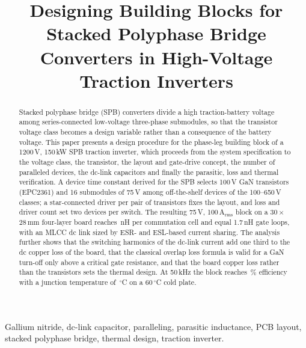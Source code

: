 \documentclass[conference]{IEEEtran}
\begin{document}
\title{Designing Building Blocks for Stacked Polyphase Bridge Converters in High-Voltage Traction Inverters}

\author{
}

\maketitle

\begin{abstract}
Stacked polyphase bridge (SPB) converters divide a high traction-battery voltage among series-connected low-voltage three-phase submodules, so that the transistor voltage class becomes a design variable rather than a consequence of the battery voltage. This paper presents a design procedure for the phase-leg building block of a 1200\,V, 150\,kW SPB traction inverter, which proceeds from the system specification to the voltage class, the transistor, the layout and gate-drive concept, the number of paralleled devices, the dc-link capacitors and finally the parasitic, loss and thermal verification. A device time constant derived for the SPB selects 100\,V GaN transistors (EPC2361) and 16 submodules of 75\,V among off-the-shelf devices of the 100--650\,V classes; a star-connected driver per pair of transistors fixes the layout, and loss and driver count set two devices per switch. The resulting 75\,V, 100\,A$_\mathrm{rms}$ block on a 30\,$\times$\,28\,mm four-layer board reaches \LloopEsl\,nH per commutation cell and equal 1.7\,nH gate loops, with an MLCC dc link sized by ESR- and ESL-based current sharing. The analysis further shows that the switching harmonics of the dc-link current add one third to the dc copper loss of the board, that the classical overlap loss formula is valid for a GaN turn-off only above a critical gate resistance, and that the board copper loss rather than the transistors sets the thermal design. At 50\,kHz the block reaches \Eta\,\% efficiency with a junction temperature of \ThFetTop\,$^\circ$C on a 60\,$^\circ$C cold plate.
\end{abstract}

\begin{IEEEkeywords}
Gallium nitride, dc-link capacitor, paralleling, parasitic inductance, PCB layout, stacked polyphase bridge, thermal design, traction inverter.
\end{IEEEkeywords}
\end{document}
